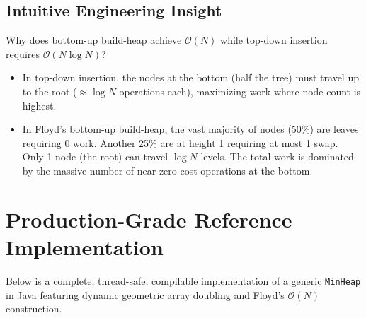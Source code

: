 \documentclass[10pt,twocolumn,letterpaper]{article}
\begin{document}
\subsection{Intuitive Engineering Insight}
Why does bottom-up build-heap achieve $\mathcal{O}(N)$ while top-down insertion requires $\mathcal{O}(N \log N)$?
\begin{itemize}
    \item In top-down insertion, the nodes at the bottom (half the tree) must travel up to the root ($\approx \log N$ operations each), maximizing work where node count is highest.
    \item In Floyd's bottom-up build-heap, the vast majority of nodes (50\%) are leaves requiring $0$ work. Another 25\% are at height 1 requiring at most 1 swap. Only 1 node (the root) can travel $\log N$ levels. The total work is dominated by the massive number of near-zero-cost operations at the bottom.
\end{itemize}

\section{Production-Grade Reference Implementation}
\label{sec:code}

Below is a complete, thread-safe, compilable implementation of a generic \texttt{MinHeap} in Java featuring dynamic geometric array doubling and Floyd's $\mathcal{O}(N)$ construction.
\end{document}
